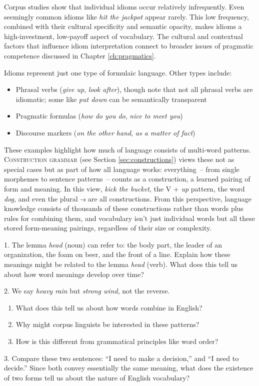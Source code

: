 Corpus studies show that individual idioms occur relatively infrequently. Even seemingly common idioms like \textit{hit the jackpot} appear rarely. This low frequency, combined with their cultural specificity and semantic opacity, makes idioms a high-investment, low-payoff aspect of vocabulary. The cultural and contextual factors that influence idiom interpretation connect to broader issues of pragmatic competence discussed in Chapter \ref{ch:pragmatics}.

Idioms represent just one type of formulaic language. Other types include:
\begin{itemize}[noitemsep]
\item Phrasal verbs (\textit{give up}, \textit{look after}), though note that not all phrasal verbs are idiomatic; some like \textit{put down} can be semantically transparent
\item Pragmatic formulas (\textit{how do you do}, \textit{nice to meet you})
\item Discourse markers (\textit{on the other hand}, \textit{as a matter of fact})
\end{itemize}

These examples highlight how much of language consists of multi-word patterns. \textsc{Construction grammar} (see Section \ref{sec:constructions}) views these not as special cases but as part of how all language works: everything~-- from single morphemes to sentence patterns~-- counts as a construction, a learned pairing of form and meaning. In this view, \textit{kick the bucket}, the V + \textit{up} pattern, the word \textit{dog}, and even the plural \textit{-s} are all constructions. From this perspective, language knowledge consists of thousands of these constructions rather than words plus rules for combining them, and vocabulary isn't just individual words but all these stored form-meaning pairings, regardless of their size or complexity.

\begin{tcolorbox}[title=Exercise: Meaning and Use, colback=white, colframe=purple!75!black, fonttitle=\bfseries]
1. The lemma \textit{head} (noun) can refer to: the body part, the leader of an organization, the foam on beer, and the front of a line. Explain how these meanings might be related to the lemma \textit{head} (verb). What does this tell us about how word meanings develop over time?

2. We say \textit{heavy rain} but \textit{strong wind}, not the reverse. 
 \begin{enumerate}[nosep]
 \item What does this tell us about how words combine in English?
 \item Why might corpus linguists be interested in these patterns?
 \item How is this different from grammatical principles like word order?
 \end{enumerate}

3. Compare these two sentences: ``I need to make a decision,'' and ``I need to decide.'' Since both convey essentially the same meaning, what does the existence of two forms tell us about the nature of English vocabulary?
\end{tcolorbox}

